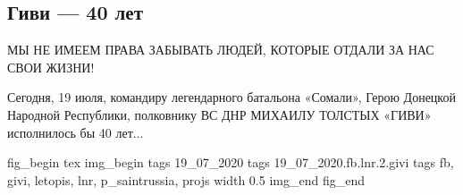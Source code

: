  
 
\subsection{Гиви --- 40 лет}
\label{sec:19_07_2020.fb.lnr.2.givi}
  
МЫ НЕ ИМЕЕМ ПРАВА ЗАБЫВАТЬ ЛЮДЕЙ, КОТОРЫЕ ОТДАЛИ ЗА НАС СВОИ ЖИЗНИ!

Сегодня, 19 июля, командиру легендарного батальона «Сомали», Герою Донецкой
Народной Республики, полковнику ВС ДНР МИХАИЛУ ТОЛСТЫХ «ГИВИ» исполнилось бы 40
лет...

\ifcmt
fig_begin 
  tex \centering
  img_begin 
    tags 19_07_2020
    tags 19_07_2020.fb.lnr.2.givi
    tags fb, givi, letopis, lnr, p_saintrussia, projs
    width 0.5
  img_end
fig_end
\fi
